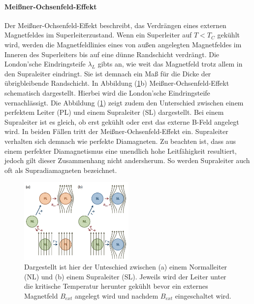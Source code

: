 \paragraph{Mei{\ss}ner-Ochsenfeld-Effekt}
Der Mei{\ss}ner-Ochsenfeld-Effekt beschreibt, das Verdr\"{a}ngen eines externen Magnetfeldes im Superleiterzustand.
Wenn ein Superleiter auf $T < T_C$ gek\"{u}hlt wird, werden die Magnetfeldlinies eines von au{\ss}en angelegten Magnetfeldes im Inneren des Superleiters bis auf eine d\"{u}nne Randschicht verdr\"{a}ngt.
Die London'sche Eindringsteife $\lambda_L$ gibts an, wie weit das Magnetfeld trotz allem in den Supraleiter eindringt.
Sie ist demnach ein Ma{\ss} f\"{u}r die Dicke der \"{u}brigbleibende Randschicht.
In Abbildung (\ref{abb:MOEffekt}b) Mei{\ss}ner-Ochsenfeld-Effekt schematisch dargestellt.
Hierbei wird die London'sche Eindringsteife vernachl\"{a}ssigt.
Die Abbildung (\ref{abb:MOEffekt}) zeigt zudem den Unterschied zwischen einem perfektem Leiter (PL) und einem Supraleiter (SL) dargestellt.
Bei einem Supraleiter ist es gleich, ob erst gek\"{u}hlt oder erst das externe B-Feld angelegt wird.
In beiden F\"{a}llen tritt der Mei{\ss}ner-Ochsenfeld-Effekt ein.
Supraleiter verhalten sich demnach wie perfekte Diamagneten.
Zu beachten ist, dass aus einem perfekter Diamagnetismus eine unendlich hohe Leitf\"{a}higkeit resultiert, jedoch gilt dieser Zusammenhang nicht andersherum.
So werden Supraleiter auch oft als Supradiamagneten bezeichnet.
\begin{figure}
	\centering
	\includegraphics[width=0.5\textwidth]{Plots/MO_Effekt.png}
	\caption{Dargestellt ist hier der Unteschied zwischen (a) einem Normalleiter (NL) und (b) einem Supraleiter (SL). Jeweils wird der Leiter unter die kritische Temperatur herunter gek\"{u}hlt bevor ein externes Magnetfeld $B_{ext}$ angelegt wird und nachdem $B_{ext}$ eingeschaltet wird. \cite{einleitung}}
	\label{abb:MOEffekt}
\end{figure}


